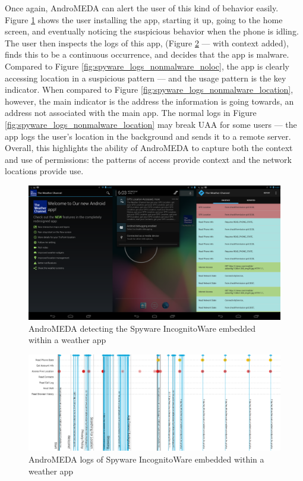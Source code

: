 Once again, AndroMEDA can alert the user of this kind of behavior easily. Figure \ref{fig:spyware_visual} shows the user installing the app, starting it up, going to the home screen, and eventually noticing the suspicious behavior when the phone is idling. The user then inspects the logs of this app, (Figure \ref{fig:spyware_logs_malware} --- with context added), finds this to be a continuous occurrence, and decides that the app is malware. Compared to Figure \ref{fig:spyware_logs_nonmalware_noloc}, the app is clearly accessing location in a suspicious pattern --- and the usage pattern is the key indicator. When compared to Figure \ref{fig:spyware_logs_nonmalware_location}, however, the main indicator is the address the information is going towards, an address not associated with the main app. The normal logs in Figure \ref{fig:spyware_logs_nonmalware_location} may break UAA for some users --- the app logs the user's location in the background and sends it to a remote server. Overall, this highlights the ability of AndroMEDA to capture both the context and use of permissions: the patterns of access provide context and the network locations provide use.




\begin{figure}[h]
\begin{center}
\includegraphics[width=1.0\columnwidth]{figs/weather_detection}
\caption{AndroMEDA detecting the Spyware IncognitoWare embedded within a weather app }
\label{fig:spyware_visual}
\end{center}
\end{figure}


\begin{figure}[h]
\begin{center}
\includegraphics[width=1.0\columnwidth]{figs/AndroMEDA_Weather_Malware}
\caption{AndroMEDA logs of Spyware IncognitoWare embedded within a weather app }
\label{fig:spyware_logs_malware}
\end{center}
\end{figure}

